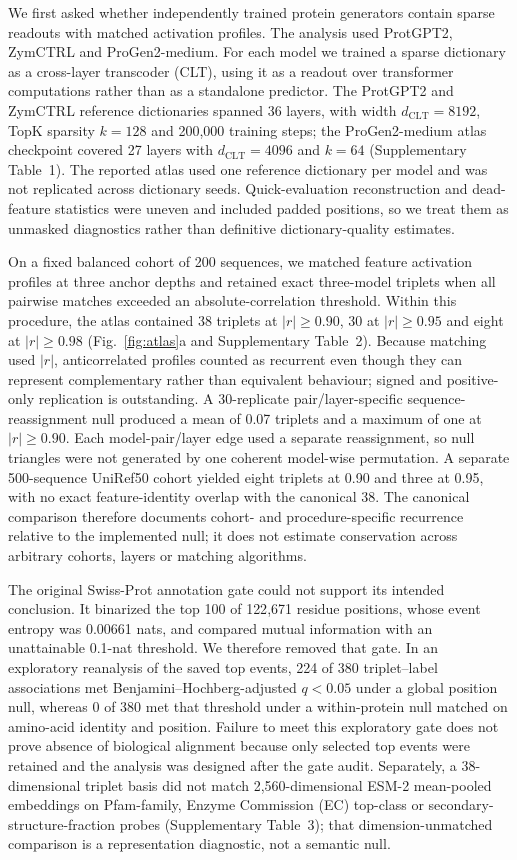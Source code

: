 \documentclass[pdflatex,sn-nature]{sn-jnl}
\begin{document}
We first asked whether independently trained protein generators contain sparse readouts with matched activation profiles. The analysis used ProtGPT2, ZymCTRL and ProGen2-medium. For each model we trained a sparse dictionary as a cross-layer transcoder (CLT), using it as a readout over transformer computations rather than as a standalone predictor. The ProtGPT2 and ZymCTRL reference dictionaries spanned 36 layers, with width $d_\mathrm{CLT}=8192$, TopK sparsity $k=128$ and 200{,}000 training steps; the ProGen2-medium atlas checkpoint covered 27 layers with $d_\mathrm{CLT}=4096$ and $k=64$ (Supplementary Table~1). The reported atlas used one reference dictionary per model and was not replicated across dictionary seeds. Quick-evaluation reconstruction and dead-feature statistics were uneven and included padded positions, so we treat them as unmasked diagnostics rather than definitive dictionary-quality estimates.

On a fixed balanced cohort of 200 sequences, we matched feature activation profiles at three anchor depths and retained exact three-model triplets when all pairwise matches exceeded an absolute-correlation threshold. Within this procedure, the atlas contained 38 triplets at $|r|\geq0.90$, 30 at $|r|\geq0.95$ and eight at $|r|\geq0.98$ (Fig.~\ref{fig:atlas}a and Supplementary Table~2). Because matching used $|r|$, anticorrelated profiles counted as recurrent even though they can represent complementary rather than equivalent behaviour; signed and positive-only replication is outstanding. A 30-replicate pair/layer-specific sequence-reassignment null produced a mean of 0.07 triplets and a maximum of one at $|r|\geq0.90$. Each model-pair/layer edge used a separate reassignment, so null triangles were not generated by one coherent model-wise permutation. A separate 500-sequence UniRef50 cohort yielded eight triplets at 0.90 and three at 0.95, with no exact feature-identity overlap with the canonical 38. The canonical comparison therefore documents cohort- and procedure-specific recurrence relative to the implemented null; it does not estimate conservation across arbitrary cohorts, layers or matching algorithms.

The original Swiss-Prot annotation gate could not support its intended conclusion. It binarized the top 100 of 122{,}671 residue positions, whose event entropy was 0.00661 nats, and compared mutual information with an unattainable 0.1-nat threshold. We therefore removed that gate. In an exploratory reanalysis of the saved top events, 224 of 380 triplet--label associations met Benjamini--Hochberg-adjusted $q<0.05$ under a global position null, whereas 0 of 380 met that threshold under a within-protein null matched on amino-acid identity and position. Failure to meet this exploratory gate does not prove absence of biological alignment because only selected top events were retained and the analysis was designed after the gate audit. Separately, a 38-dimensional triplet basis did not match 2,560-dimensional ESM-2 mean-pooled embeddings on Pfam-family, Enzyme Commission (EC) top-class or secondary-structure-fraction probes (Supplementary Table~3); that dimension-unmatched comparison is a representation diagnostic, not a semantic null.
\end{document}
